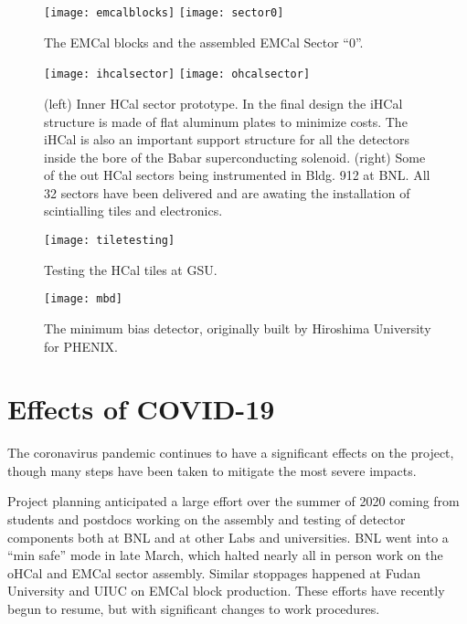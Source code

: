 \begin{figure}[hbt!]
  \centering
  \texttt{[image: emcalblocks]}
  \hfill
  \texttt{[image: sector0]}
  \caption{The EMCal blocks and the assembled EMCal Sector ``0''.}
  \label{fig:emcal}
\end{figure}

\begin{figure}[hbt!]
  \centering
  \texttt{[image: ihcalsector]}
  \hfill
  \texttt{[image: ohcalsector]}
  \caption{(left) Inner HCal sector prototype. In the final design the
    iHCal structure is made of flat aluminum plates to minimize
    costs. The iHCal is also an important support structure for all
    the detectors inside the bore of the Babar superconducting
    solenoid. (right) Some of the out HCal sectors being instrumented in
    Bldg. 912 at BNL.  All 32 sectors have been delivered and are
    awating the installation of scintialling tiles and electronics.}
  \label{fig:hcal}
\end{figure}

\begin{figure}[hbt!]
  \centering
  \texttt{[image: tiletesting]}
  \caption{Testing the HCal tiles at GSU.}
  \label{fig:tiletesting}
\end{figure}

\begin{figure}[hbt!]
  \centering
  \texttt{[image: mbd]}
  \caption{The minimum bias detector, originally built by Hiroshima
    University for PHENIX.}
  \label{fig:mbd}
\end{figure}

\section{Effects of COVID-19}
\label{sec:covid}

The coronavirus pandemic continues to have a significant effects on the
project, though many steps have been taken to mitigate the most severe
impacts.

Project planning anticipated a large effort over the summer of 2020
coming from students and postdocs working on the assembly and testing
of detector components both at BNL and at other Labs and universities.
BNL went into a ``min safe'' mode in late March, which halted nearly
all in person work on the oHCal and EMCal sector assembly.  Similar
stoppages happened at Fudan University and UIUC on EMCal block
production.  These efforts have recently begun to resume, but with
significant changes to work procedures.

